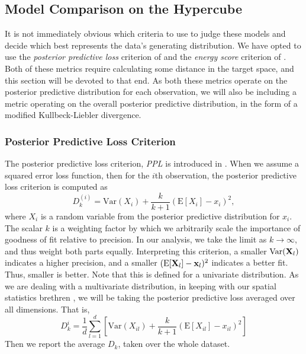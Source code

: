\subsection{Model Comparison on the Hypercube}
It is not immediately obvious which criteria to use to judge these models and decide which best
  represents the data's generating distribution.  We have opted to use the
  \emph{posterior predictive loss} criterion of \cite{gelfand1998} and the
  \emph{energy score} criterion of \cite{gneiting2007}.  Both of these
  metrics require calculating some distance in the target space, and this section will be devoted
  to that end.  As both these metrics operate on the posterior predictive distribution for each
  observation, we will also be including a metric operating on the overall posterior predictive
  distribution, in the form of a modified Kullbeck-Liebler divergence.

\subsubsection{Posterior Predictive Loss Criterion}
The posterior predictive loss criterion, \emph{PPL} is introduced in \cite{gelfand1998}.  When we
  assume a squared error loss function, then for the $i$th observation, the posterior predictive
  loss criterion is computed as
  \begin{equation}
    \label{eq:ppl}
    D_{k}^{(i)} = \text{Var}(X_i) + \frac{k}{k + 1}\left(\text{E}[X_i] - x_i\right)^2,
  \end{equation}
  where $X_i$ is a random variable from the posterior predictive distribution for $x_i$.  The
  scalar $k$ is a weighting factor by which we arbitrarily scale the importance of goodness of fit
  relative to precision.  In our analysis, we take the limit as $k\to\infty$, and thus weight both
  parts equally.  Interpreting this criterion, a smaller $\text{Var}({\bf X}_l)$ indicates a higher
  precision, and a smaller $(\text{E}[{\bf X}_l] - {\bf x}_l)^2$  indicates a better fit.  Thus,
  smaller is better.  Note that this is defined for a univariate distribution.  As we are dealing
  with a multivariate distribution, in keeping with our spatial statistics brethren
  , we will be taking the posterior predictive loss
  averaged over all dimensions.  That is,
  \begin{equation}
    \label{eq:ppl2}
    D_k^{i} = \frac{1}{d}\sum_{l = 1}^{d}\left[\text{Var}(X_{il}) + \frac{k}{k+1}\left(\text{E}[X_{il}] - x_{il}\right)^2\right]
  \end{equation}
  Then we report the average $D_k$, taken over the whole dataset.

